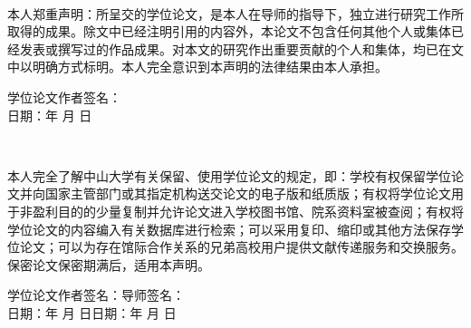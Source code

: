 \begin{center}
	\\
\end{center}

\begin{flushleft}%
	\songti
	\renewcommand{\baselineskip}{1.6em}	%
	\quad\quad 本人郑重声明：所呈交的学位论文，是本人在导师的指导下，独立进行研究工作所取得的成果。除文中已经注明引用的内容外，本论文不包含任何其他个人或集体已经发表或撰写过的作品成果。对本文的研究作出重要贡献的个人和集体，均已在文中以明确方式标明。本人完全意识到本声明的法律结果由本人承担。
\end{flushleft}

\begin{flushright}     %
	\renewcommand{\baselineskip}{1.6em}	%
	学位论文作者签名：\quad\quad\quad\quad\quad\quad \\
	日期：\quad\quad 年  \quad\quad  月  \quad\quad  日\quad\quad\quad\quad \\
\end{flushright}

\begin{center}
	\vspace*{56pt} %
	\\
\end{center}

\begin{flushleft}%
	\songti
	\renewcommand{\baselineskip}{1.6em}	%
	\quad\quad 本人完全了解中山大学有关保留、使用学位论文的规定，即：学校有权保留学位论文并向国家主管部门或其指定机构送交论文的电子版和纸质版；有权将学位论文用于非盈利目的的少量复制并允许论文进入学校图书馆、院系资料室被查阅；有权将学位论文的内容编入有关数据库进行检索；可以采用复印、缩印或其他方法保存学位论文；可以为存在馆际合作关系的兄弟高校用户提供文献传递服务和交换服务。\\
	\quad\quad 保密论文保密期满后，适用本声明。\\
\end{flushleft}
	
\begin{flushleft} %
	\renewcommand{\baselineskip}{1.6em}	%
	学位论文作者签名：\quad\quad\quad\quad\quad\quad 导师签名：\\
	日期：\quad\quad 年  \quad\quad  月  \quad\quad  日\quad\quad\quad  日期：\quad\quad 年  \quad\quad  月  \quad\quad  日\quad\quad\quad\quad\\
\end{flushleft}